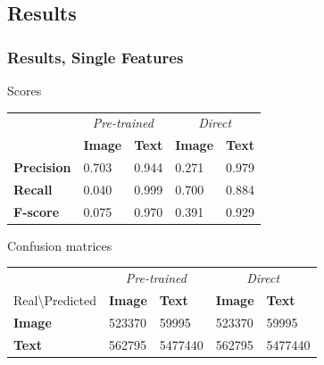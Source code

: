 \subsection{Results}


\begin{frame}
\frametitle{Results, Single Features}

\begin{block}{Scores}
\begin{tabular}{l l l  | l l}
 & \multicolumn{2}{c}{\emph{Pre-trained}} & \multicolumn{2}{c}{\emph{Direct}} \\
& \textbf{Image} & \textbf{Text} & \textbf{Image} & \textbf{Text} \\
\textbf{Precision} & 0.703 & 0.944 & 0.271 & 0.979 \\
\textbf{Recall}    & 0.040 & 0.999 & 0.700 & 0.884 \\
\textbf{F-score}   & 0.075 & 0.970 & 0.391 & 0.929
\end{tabular}
\end{block}

\begin{block}{Confusion matrices}
\begin{tabular}{l l l | l l }
& \multicolumn{2}{c}{\emph{Pre-trained}} & \multicolumn{2}{c}{\emph{Direct}} \\
Real\textbackslash Predicted & \textbf{Image} & \textbf{Text} & \textbf{Image} & \textbf{Text} \\
\textbf{Image} &  523370&  59995& 523370 & 59995 \\
\textbf{Text} &  562795&  5477440& 562795 & 5477440
\end{tabular}
\end{block}
\end{frame}



